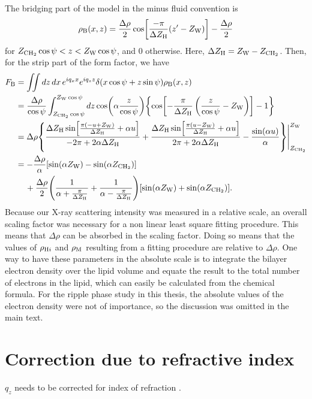The bridging part of the model in the minus fluid convention is 
\begin{align}
  \rho_\mathrm{B}(x,z) = \frac{\Delta\rho}{2} \cos \mathopen{}\left[ 
    \frac{-\pi}{\Delta Z_\mathrm{H}}(z'-Z_\mathrm{W}) \right]\mathclose{} - \frac{\Delta\rho}{2}
\end{align}
for $Z_\mathrm{CH_2}\cos\psi < z < Z_\mathrm{W}\cos\psi$, and 0 otherwise. Here,
$\Delta Z_\mathrm{H}=Z_\mathrm{W}-Z_\mathrm{CH_2}$.
Then, for the strip part of the form factor, we have
\begin{align}
  F_\mathrm{B} 
  &= \iint\mathop{dz}\mathop{dx} e^{iq_xx}e^{iq_zz} \delta(x\cos\psi+z\sin\psi) \rho_\mathrm{B}(x,z) \nonumber\\
  &= \frac{\Delta\rho}{\cos\psi}
     \int_{Z_\mathrm{CH_2}\cos\psi}^{Z_\mathrm{W}\cos\psi}\mathop{dz} \cos\mathopen{}\left( \alpha\frac{z}{\cos\psi} \right)\mathclose{} 
     \mathopen{}\left\lbrace \cos\mathopen{}\left[ -\frac{\pi}{\Delta Z_\mathrm{H}}\left(\frac{z}{\cos\psi}-Z_\mathrm{W}\right) \right]\mathclose{} - 1 \right\rbrace\mathclose{} \nonumber\\
  &= \Delta\rho \mathopen{}\left\lbrace 
       \frac{\Delta Z_\mathrm{H}\sin\mathopen{}\left[ \frac{\pi(-u+Z_\mathrm{W})}{\Delta Z_\mathrm{H}}+\alpha u \right]\mathclose{}}{-2\pi+2\alpha\Delta Z_\mathrm{H}}
       + \frac{\Delta Z_\mathrm{H}\sin\mathopen{}\left[ \frac{\pi(u-Z_\mathrm{W})}{\Delta Z_\mathrm{H}}+\alpha u \right]\mathclose{}}{2\pi+2\alpha\Delta Z_\mathrm{H}}
       - \frac{\sin(\alpha u)}{\alpha}  
      \right\rbrace\mathclose{}\Bigg|_{Z_\mathrm{CH_2}}^{Z_\mathrm{W}} \nonumber\\
  &= -\frac{\Delta\rho}{\alpha}\mathopen{}\left[ \sin(\alpha Z_\mathrm{W})-\sin(\alpha Z_\mathrm{CH_2}) \right]\mathclose{} \nonumber\\
  & \,\quad + \frac{\Delta\rho}{2} \mathopen{}\left( 
      \frac{1}{\alpha+\frac{\pi}{\Delta Z_\mathrm{H}}} 
      + \frac{1}{\alpha-\frac{\pi}{\Delta Z_\mathrm{H}}}
     \right)\mathclose{}\mathopen{}\left[ \sin(\alpha Z_\mathrm{W})+\sin(\alpha Z_\mathrm{CH_2}) \right]\mathclose{}.
\end{align}
Because our X-ray scattering intensity was measured in a relative scale, 
an overall scaling factor was necessary for a non linear least square 
fitting procedure. This means that $\Delta\rho$ can be absorbed in the 
scaling factor. Doing so means that the values of $\rho_{\mathrm{H}i}$ and $\rho_\mathrm{M}$
resulting from a fitting procedure are relative to $\Delta\rho$. One way 
to have these parameters in the absolute scale is to integrate the 
bilayer electron density over the lipid volume and equate the result
to the total number of electrons in the lipid, which can easily be calculated
from the chemical formula. For the ripple phase study in this thesis, the
absolute values of the electron density were not of importance, so the
discussion was omitted in the main text.

\newpage
\section{Correction due to refractive index}\label{app:refraction}
$q_z$ needs to be corrected for index of refraction \cite{Liu03}. 

